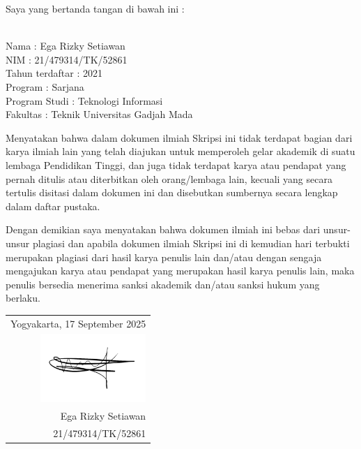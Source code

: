 \noindent Saya yang bertanda tangan di bawah ini :

\vspace{-1em}

\begin{tabbing}
	\hspace{40mm} \= \\ %
	\noindent Nama \> : Ega Rizky Setiawan\\[\parskip]
	\noindent NIM \> : 21/479314/TK/52861 \\[\parskip]
	\noindent Tahun terdaftar \> : 2021 \\[\parskip]
	\noindent Program \> : Sarjana \\[\parskip]
	\noindent Program Studi \> : Teknologi Informasi \\[\parskip]
	\noindent Fakultas \> : Teknik Universitas Gadjah Mada
\end{tabbing}

\noindent Menyatakan bahwa dalam dokumen ilmiah Skripsi ini tidak terdapat bagian dari karya ilmiah lain yang telah diajukan untuk memperoleh gelar akademik di suatu lembaga Pendidikan Tinggi, dan juga tidak terdapat karya atau pendapat yang pernah ditulis atau diterbitkan oleh orang/lembaga lain, kecuali yang secara tertulis disitasi dalam dokumen ini dan disebutkan sumbernya secara lengkap dalam daftar pustaka.

\noindent Dengan demikian saya menyatakan bahwa dokumen ilmiah ini bebas dari unsur-unsur plagiasi dan apabila dokumen ilmiah Skripsi ini di kemudian hari terbukti merupakan plagiasi dari hasil karya penulis lain dan/atau dengan sengaja mengajukan karya atau pendapat yang merupakan hasil karya penulis lain, maka penulis bersedia menerima sanksi akademik dan/atau sanksi hukum yang berlaku.


\begin{flushright}
	\begin{tabular}{r}
		Yogyakarta, 17 September 2025                      \\
		\includegraphics[width=4cm]{./images/sign-ega.png} \\
		Ega Rizky Setiawan                                 \\ 21/479314/TK/52861
	\end{tabular}
\end{flushright}